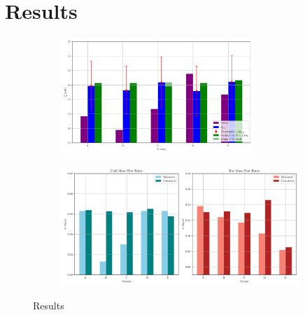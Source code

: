 \documentclass{article}
\begin{document}
\section{Results}

\begin{figure}[H]
    \centering
    \begin{subfigure}{0.8\textwidth}
        \centering
        \includegraphics[width=0.8\textwidth]{2024_results.png}
        \label{fig:Qdot_results} 
    \end{subfigure}
    \begin{subfigure}{0.9\textwidth}
        \centering
        \includegraphics[width=0.99\textwidth]{2024_mass_flow_rates.png}
        \label{fig:mdot_results}
    \end{subfigure}
    \caption{Results}
\end{figure}
\end{document}
